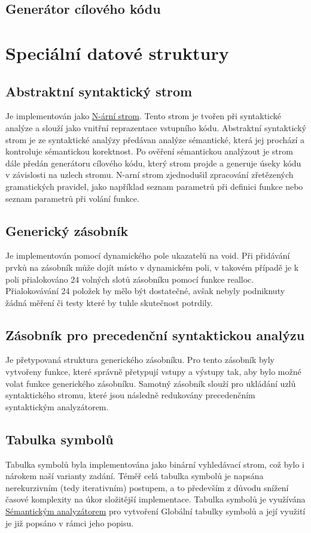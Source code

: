 \documentclass[a4paper, 11pt]{article}
\begin{document}
	\subsection{Generátor cílového kódu}
	
	\section{Speciální datové struktury}
	\subsection{Abstraktní syntaktický strom}
	\label{abstrtree}
	Je implementován jako \href{https://en.wikipedia.org/wiki/M-ary_tree}{N-ární strom}. Tento strom je tvořen při syntaktické analýze a slouží jako vnitřní 
	reprazentace vstupního kódu. Abstraktní syntaktický strom je ze syntaktické analýzy předávan analýze sémantické, která jej prochází a kontroluje 
	sémantickou korektnost. Po ověření sémantickou analýzout je strom dále předán generátoru cílového kódu, který strom projde a generuje úseky kódu v 
	závislosti na uzlech stromu. N-arní strom zjednodušil zpracování zřetězených gramatických pravidel, jako například seznam parametrů při definici funkce 
	nebo seznam parametrů při volání funkce.

	\subsection{Generický zásobník}
	Je implementován pomocí dynamického pole ukazatelů na void. Při přidávání prvků na zásobník může dojít místo v dynamickém poli, v takovém případě je k 
	poli přialokováno 24 volných slotů zásobníku pomocí funkce realloc. Přialokovávání 24 položek by mělo být dostatečné, avšak nebyly podniknuty žádná měření 
	či testy které by tuhle skutečnost potrdily.
    
	\subsection{Zásobník pro precedenční syntaktickou analýzu}
	Je přetypovaná struktura generického zásobníku. Pro tento zásobník byly vytvořeny funkce, které správně přetypují vstupy a výstupy tak, aby bylo možné 
	volat funkce generického zásobníku. Samotný zásobník slouží pro ukládání uzlů syntaktického stromu, které jsou následně redukovány precedenčním 
	syntaktickým analyzátorem.

	\subsection{Tabulka symbolů}
	\label{symtab}
	Tabulka symbolů byla implementována jako binární vyhledávací strom, což bylo i nárokem naší varianty zadání. Téměř celá tabulka symbolů je napsána 
	nerekurzivním (tedy iterativním) postupem, a to především z důvodu snížení časové komplexity na úkor složitější implementace. Tabulka symbolů je 
	využívána \hyperref[semantic]{Sémantickým analyzátorem} pro vytvoření Globální tabulky symbolů a její využití je již popsáno v rámci jeho popisu.
\end{document}

